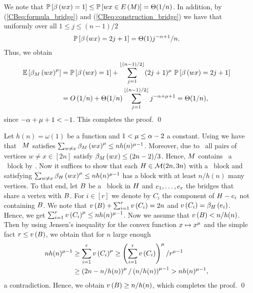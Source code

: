 We note that $\mathbb{P}\left[\beta\left(wx\right)=1\right]\leq \mathbb{P}\left[wx\in E\left(M\right)\right]=\Theta(1/n)$. In addition, by (\ref{CBeq:formula_bridge}) and (\ref{CBeq:construction_bridge}) we have that uniformly over all $1\leq j \leq (n-1)/2$ 
\begin{align*}
\mathbb{P}\left[\beta\left(wx\right)=2j+1\right]=\Theta(1)j^{-\alpha+1}/n.
\end{align*}
Thus, we obtain
\begin{align*}
\mathbb{E}\left[\beta_{M}\left(wx\right)^\mu\right]&=\mathbb{P}\left[\beta\left(wx\right)=1\right]+\sum_{j=1}^{\lfloor(n-1)/2\rfloor}(2j+1)^\mu \ \mathbb{P}\left[\beta\left(wx\right)=2j+1\right]
\\
&=O\left(1/n\right)+\Theta(1/n)\sum_{j=1}^{\lfloor(n-1)/2\rfloor}j^{-\alpha+\mu+1}=\Theta(1/n),
\end{align*}
since $-\alpha+\mu+1<-1$. This completes the proof. \qed

Let $h(n)=\omega(1)$ be a function and $1< \mu \leq \alpha-2$ a constant. Using  we have that \whp\ $M$ satisfies $\sum_{w\neq x}\beta_{M}\left(wx\right)^\mu\leq nh(n)^{\mu-1}$. Moreover, due to  \whp\ all pairs of vertices $w\neq x \in [2n]$ satisfy $\beta_{M}\left(wx\right)\leq (2n-2)/3$. Hence, $M$ contains \whp\ a \largeBlock\ block by . Now it suffices to show that each $H \in \mathcal{M}(2n,3n)$ with a \largeBlock\ block and satisfying $\sum_{w\neq x}\beta_{H}\left(wx\right)^\mu\leq nh(n)^{\mu-1}$ has a block with at least $n/h(n)$ many vertices. To that end, let $B$ be a \largeBlock\ block in $H$ and $e_1, \ldots, e_r$ the bridges that share a vertex with $B$. For $i \in [r]$ we denote by $C_i$ the component of $H-e_i$ not containing $B$. We note that $v\left({B}\right)+\sum_{i=1}^{r}v\left({C_i}\right)=2n$ and $v\left({C_i}\right)=\beta_{H}\left(e_i\right)$. Hence, we get $\sum_{i=1}^{r}v\left({C_i}\right)^\mu\leq nh(n)^{\mu-1}$. Now we assume that $v\left({B}\right)<n/h(n)$. Then by using Jensen's inequality for the convex function $x\mapsto x^\mu$ and the simple fact $r\leq v\left({B}\right)$, we obtain that for $n$ large enough 
\begin{align*}
nh(n)^{\mu-1}&\geq \sum_{i=1}^{r}v\left({C_i}\right)^\mu\geq \left(\sum_{i=1}^{r}v\left({C_i}\right)\right)^\mu/r^{\mu-1}
\\
&\geq\left(2n-n/h(n)\right)^\mu/\left(n/h(n)\right)^{\mu-1}>nh(n)^{\mu-1},
\end{align*}
a contradiction. Hence, we obtain $v\left({B}\right)\geq n/h(n)$, which completes the proof. \qed

